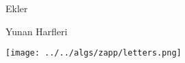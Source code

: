 \documentclass[12pt,fleqn]{article}\usepackage{../../common}
\begin{document}
Ekler

Yunan Harfleri

\texttt{[image: ../../algs/zapp/letters.png]}
\end{document}
